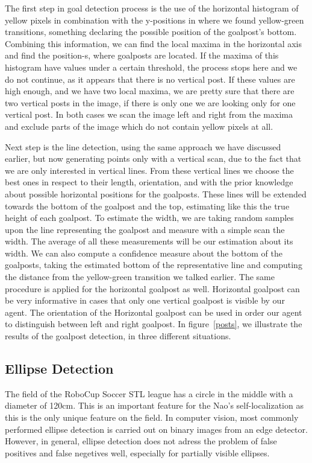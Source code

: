 \documentclass[	DIV=calc,%
							paper=a4,%
							fontsize=9pt,%
							twocolumn]{scrartcl}	 					%
\begin{document}
The first step in goal detection process is the use of the horizontal histogram of yellow pixels in combination with the y-positions in where we found yellow-green transitions, something declaring the possible position of the goalpost's bottom. Combining this information, we can find the local maxima in the horizontal axis and find the position-s, where goalposts are located. If the maxima of this histogram have values under a certain threshold, the process stops here and we do not continue, as it appears that there is no vertical post. If these values are high enough, and we have two local maxima, we are pretty sure that there are two vertical posts in the image, if there is only one we are looking only for one vertical post. In both cases we scan the image left and right from the maxima and exclude parts of the image which do not contain yellow pixels at all.

Next step is the line detection, using the same approach we have discussed earlier, but now generating points only with a vertical scan, due to the fact that we are only interested in vertical lines. From these vertical lines we choose the best ones in respect to their length, orientation, and with the prior knowledge about possible horizontal positions for the goalposts. These lines will be extended towards the bottom of the goalpost and the top, estimating like this the true height of each goalpost. To estimate the width, we are taking random samples upon the line representing the goalpost and measure with a simple scan the width. The average of all these measurements will be our estimation about its width. We can also compute a confidence measure about the bottom of the goalposts, taking the estimated bottom of the representative line and computing the distance from the yellow-green transition we talked earlier. The same procedure is applied for the horizontal goalpost as well. Horizontal goalpost can be very informative in cases that only one vertical goalpost is visible by our agent. The orientation of the Horizontal goalpost can be used in order our agent to distinguish between left and right goalpost. In figure~\ref{posts}, we illustrate the results of the goalpost detection, in three different situations.


\subsection{Ellipse Detection}
The field of the RoboCup Soccer STL league has a circle in the middle with a diameter of 120cm. This is an important feature for the Nao's self-localization as this is the only unique feature on the field. In computer vision, most commonly performed ellipse detection is carried out on binary images from an edge detector. However, in general, ellipse detection does not adress the problem of false positives and false negetives well, especially for partially visible ellipses.
\end{document}
